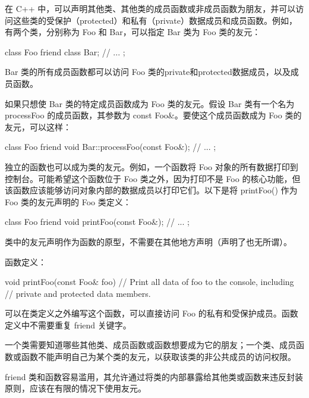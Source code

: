 在 C++ 中，可以声明其他类、其他类的成员函数或非成员函数为朋友，并可以访问这些类的受保护（protected）和私有（private）数据成员和成员函数。例如，有两个类，分别称为 Foo 和 Bar，可以指定 Bar 类为 Foo 类的友元：

\begin{cpp}
class Foo
{
    friend class Bar;
    // ...
};
\end{cpp}

Bar 类的所有成员函数都可以访问 Foo 类的private和protected数据成员，以及成员函数。

如果只想使 Bar 类的特定成员函数成为 Foo 类的友元。假设 Bar 类有一个名为 processFoo 的成员函数，其参数为 const Foo\&。要使这个成员函数成为 Foo 类的友元，可以这样：

\begin{cpp}
class Foo
{
    friend void Bar::processFoo(const Foo&);
    // ...
};
\end{cpp}

独立的函数也可以成为类的友元。例如，一个函数将 Foo 对象的所有数据打印到控制台。可能希望这个函数位于 Foo 类之外，因为打印不是 Foo 的核心功能，但该函数应该能够访问对象内部的数据成员以打印它们。以下是将 printFoo() 作为 Foo 类的友元声明的 Foo 类定义：

\begin{cpp}
class Foo
{
    friend void printFoo(const Foo&);
    // ...
};
\end{cpp}

类中的友元声明作为函数的原型，不需要在其他地方声明（声明了也无所谓）。

函数定义：

\begin{cpp}
void printFoo(const Foo& foo)
{
    // Print all data of foo to the console, including
    // private and protected data members.
}
\end{cpp}

可以在类定义之外编写这个函数，可以直接访问 Foo 的私有和受保护成员。函数定义中不需要重复 friend 关键字。

一个类需要知道哪些其他类、成员函数或函数想要成为它的朋友；一个类、成员函数或函数不能声明自己为某个类的友元，以获取该类的非公共成员的访问权限。

friend 类和函数容易滥用，其允许通过将类的内部暴露给其他类或函数来违反封装原则，应该在有限的情况下使用友元。









